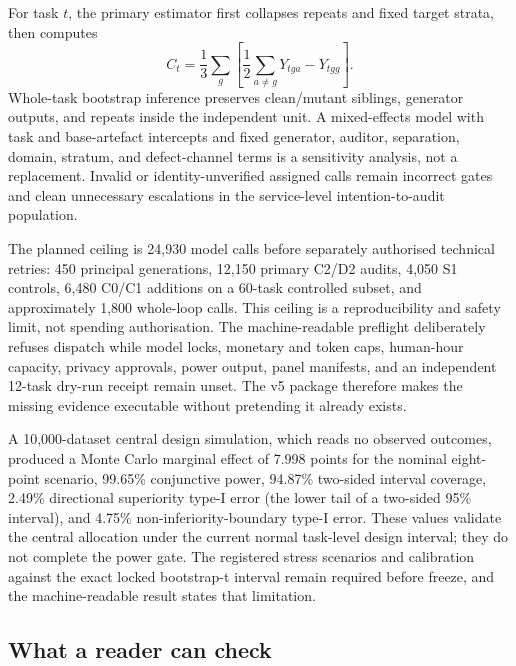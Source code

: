 \documentclass[11pt,letterpaper]{article}
\begin{document}
For task $t$, the primary estimator first collapses repeats and fixed target strata, then computes
\begin{equation}
C_t=\frac{1}{3}\sum_g\left[\frac{1}{2}\sum_{a\neq g}Y_{tga}-Y_{tgg}\right].
\end{equation}
Whole-task bootstrap inference preserves clean/mutant siblings, generator outputs, and repeats inside the independent unit. A mixed-effects model with task and base-artefact intercepts and fixed generator, auditor, separation, domain, stratum, and defect-channel terms is a sensitivity analysis, not a replacement. Invalid or identity-unverified assigned calls remain incorrect gates and clean unnecessary escalations in the service-level intention-to-audit population.

The planned ceiling is 24,930 model calls before separately authorised technical retries: 450 principal generations, 12,150 primary C2/D2 audits, 4,050 S1 controls, 6,480 C0/C1 additions on a 60-task controlled subset, and approximately 1,800 whole-loop calls. This ceiling is a reproducibility and safety limit, not spending authorisation. The machine-readable preflight deliberately refuses dispatch while model locks, monetary and token caps, human-hour capacity, privacy approvals, power output, panel manifests, and an independent 12-task dry-run receipt remain unset. The v5 package therefore makes the missing evidence executable without pretending it already exists.

A 10,000-dataset central design simulation, which reads no observed outcomes, produced a Monte Carlo marginal effect of 7.998 points for the nominal eight-point scenario, 99.65\% conjunctive power, 94.87\% two-sided interval coverage, 2.49\% directional superiority type-I error (the lower tail of a two-sided 95\% interval), and 4.75\% non-inferiority-boundary type-I error. These values validate the central allocation under the current normal task-level design interval; they do not complete the power gate. The registered stress scenarios and calibration against the exact locked bootstrap-t interval remain required before freeze, and the machine-readable result states that limitation.

\FloatBarrier

\subsection{What a reader can check}\label{sec:artefacts}
\end{document}
